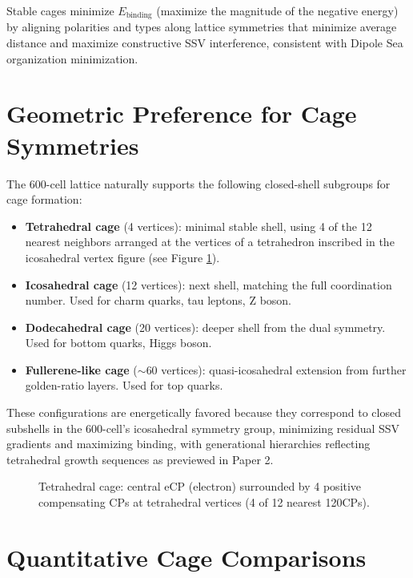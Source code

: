 \documentclass[11pt]{article}
\begin{document}
Stable cages minimize $E_{\text{binding}}$ (maximize the magnitude of the negative energy) by aligning polarities and types along lattice symmetries that minimize average distance and maximize constructive SSV interference, consistent with Dipole Sea organization minimization.

\section{Geometric Preference for Cage Symmetries}

The 600-cell lattice naturally supports the following closed-shell subgroups for cage formation:

\begin{itemize}
    \item \textbf{Tetrahedral cage} (4 vertices): minimal stable shell, using 4 of the 12 nearest neighbors arranged at the vertices of a tetrahedron inscribed in the icosahedral vertex figure (see Figure \ref{fig:tetrahedral-cage}).
    \item \textbf{Icosahedral cage} (12 vertices): next shell, matching the full coordination number. Used for charm quarks, tau leptons, Z boson.
    \item \textbf{Dodecahedral cage} (20 vertices): deeper shell from the dual symmetry. Used for bottom quarks, Higgs boson.
    \item \textbf{Fullerene-like cage} ($\sim$60 vertices): quasi-icosahedral extension from further golden-ratio layers. Used for top quarks.
\end{itemize}

These configurations are energetically favored because they correspond to closed subshells in the 600-cell’s icosahedral symmetry group, minimizing residual SSV gradients and maximizing binding, with generational hierarchies reflecting tetrahedral growth sequences as previewed in Paper 2.

\begin{figure}[h]
\centering
\caption{Tetrahedral cage: central eCP (electron) surrounded by 4 positive compensating CPs at tetrahedral vertices (4 of 12 nearest 120CPs).}
\label{fig:tetrahedral-cage}
\end{figure}

\section{Quantitative Cage Comparisons}
\end{document}
